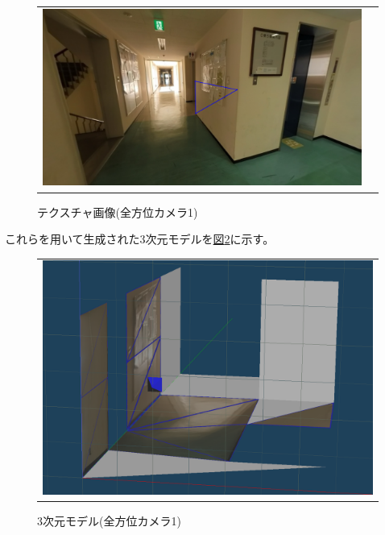 \documentclass[]{jarticle}          %
\begin{document}
\begin{figure}[H]
\begin{center}
\begin{tabular}{cc}
      \includegraphics[keepaspectratio, scale=0.08]{figures/texture0/texture_0_15.png}\\
    \end{tabular}
  \end{center}
  \caption{テクスチャ画像(全方位カメラ1)}
  \label{two}
\end{figure}

これらを用いて生成された3次元モデルを\hyperref[three]{図\ref{three}}に示す。

\begin{figure}[H]
  \begin{center}
    \begin{tabular}{c}
      \includegraphics[keepaspectratio, scale=0.4]{figures/3dmodel0.png}
    \end{tabular}
  \end{center}
  \caption{3次元モデル(全方位カメラ1)}
  \label{three}
\end{figure}
\end{document}

